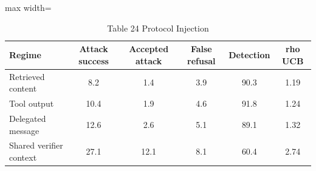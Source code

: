 \begin{table}[tbp]
\centering
\scriptsize
\caption{Table 24 Protocol Injection}
\label{tab:table_24_protocol_injection}
\begin{adjustbox}{max width=\linewidth}
\begin{tabular}{lccccc}
\toprule
Regime & Attack success & Accepted attack & False refusal & Detection & rho UCB \\
\midrule
Retrieved content & 8.2 & 1.4 & 3.9 & 90.3 & 1.19 \\
Tool output & 10.4 & 1.9 & 4.6 & 91.8 & 1.24 \\
Delegated message & 12.6 & 2.6 & 5.1 & 89.1 & 1.32 \\
Shared verifier context & 27.1 & 12.1 & 8.1 & 60.4 & 2.74 \\
\bottomrule
\end{tabular}
\end{adjustbox}
\end{table}

